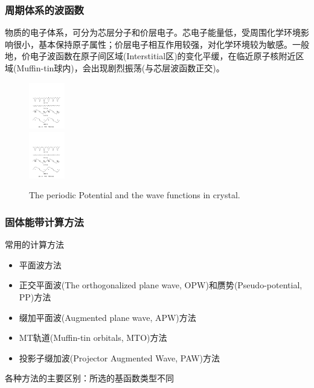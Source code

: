 \frame
{
\frametitle{周期体系的波函数}
物质的电子体系，可分为芯层分子和价层电子。芯电子能量低，受周围化学环境影响很小，基本保持原子属性；价层电子相互作用较强，对化学环境较为敏感。一般地，价电子波函数在原子间区域(\textrm{Interstitial}区)的变化平缓，在临近原子核附近区域(\textrm{Muffin-tin}球内)，会出现剧烈振荡(与芯层波函数正交)。
\begin{figure}[h!]
\centering
\includegraphics[height=0.8in,width=4.in,viewport=41 433 539 546,clip]{Figures/Pseudo_wave.pdf}\\
\includegraphics[height=0.8in,width=4.in,viewport=41 210 539 339,clip]{Figures/Pseudo_wave.pdf}
\caption{\small \textrm{The periodic Potential and the wave functions in crystal.}}%
\label{Potential-Wave}
\end{figure}
}

\frame
{
\frametitle{固体能带计算方法}
\vskip 10pt
常用的计算方法
\begin{itemize}%
\setlength{\itemsep}{15pt}
	\item	平面波方法
	\item	正交平面波\textrm{(The orthogonalized plane wave, OPW)}和赝势\textrm{(Pseudo-potential, PP)}方法
	\item	缀加平面波\textrm{(Augmented plane wave, APW)}方法
	\item	\textrm{MT}轨道\textrm{(Muffin-tin orbitals, MTO)}方法
	\item	投影子缀加波\textrm{(Projector Augmented Wave, PAW)}方法
\end{itemize}
  \vskip 5pt 各种方法的主要区别：所选的基函数类型不同
}

